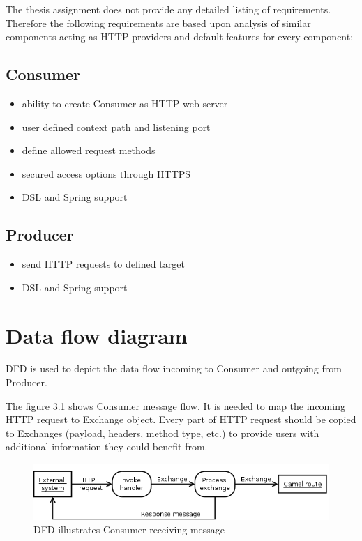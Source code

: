 \documentclass[12pt,final,oneside]{fithesis2}
\begin{document}
The thesis assignment does not provide any detailed listing of requirements. Therefore the following requirements are based upon analysis of similar components acting as HTTP providers and default features for every component:

\subsection{Consumer}
\begin{itemize}
\item ability to create Consumer as HTTP web server 
\item user defined context path and listening port
\item define allowed request methods
\item secured access options through HTTPS
\item DSL and Spring support
\end{itemize}

\subsection{Producer}
\begin{itemize}
\item send HTTP requests to defined target 
\item DSL and Spring support
\end{itemize}

\section{Data flow diagram}
DFD is used to depict the data flow incoming to Consumer and outgoing from Producer.

The figure 3.1 shows Consumer message flow. It is needed to map the incoming HTTP request to Exchange object. Every part of HTTP request should be copied to Exchanges (payload, headers, method type, etc.) to provide users with additional information they could benefit from.
\begin{figure}[!h]
\centering
\includegraphics[width=1\linewidth]{images/consumer.png}
\caption{DFD illustrates Consumer receiving message}
\end{figure}
\end{document}
